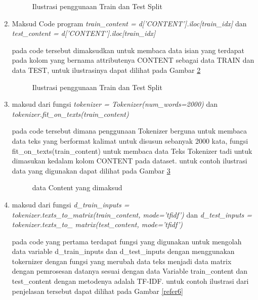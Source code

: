 \begin{enumerate}
\begin{figure}[!htbp]
      \caption{Ilustrasi  penggunaan Train dan Test Split}
      \label{refer3}
\end{figure}

\item Maksud Code program \emph{train\_content = d['CONTENT'].iloc[train\_idx]} dan \emph{test\_content = d['CONTENT'].iloc[train\_idx]}
\par pada code tersebut dimaksudkan untuk membaca data isian yang terdapat pada kolom yang bernama attributenya CONTENT sebagai data TRAIN dan data TEST, untuk ilustrasinya dapat dilihat pada Gambar \ref{refer4}

\begin{figure}[!htbp]
      \caption{Ilustrasi  penggunaan Train dan Test Split}
      \label{refer4}
\end{figure}

\item maksud dari fungsi \emph{tokenizer = Tokenizer(num\_words=2000)} dan \emph{tokenizer.fit\_on\_texts(train\_content)}
\par pada code tersebut dimana penggunaan Tokenizer berguna untuk membaca data teks yang berformat kalimat untuk disusun sebanyak 2000 kata, fungsi fit\_on\_texts(train\_content) untuk membaca data Teks Tokenizer tadi untuk dimasukan kedalam kolom CONTENT pada dataset. untuk contoh ilustrasi data yang digunakan dapat dilihat pada Gambar \ref{refer5}

\begin{figure}[!htbp]
      \caption{data Content yang dimaksud}
      \label{refer5}
\end{figure}

\item maksud dari fungsi \emph{d\_train\_inputs = tokenizer.texts\_to\_matrix(train\_content, mode='tfidf')} dan \emph{d\_test\_inputs = tokenizer.texts\_to\_ matrix(test\_content, mode='tfidf')}

\par pada code yang pertama terdapat fungsi yang digunakan untuk mengolah data variable d\_train\_inputs dan d\_test\_inputs dengan menggunakan tokernizer dengan fungsi yang merubah data teks menjadi data matrix dengan pemrosesan datanya sesuai dengan data Variable train\_content dan test\_content dengan metodenya adalah TF-IDF. untuk contoh ilustrasi dari penjelasan tersebut dapat dilihat pada Gambar \ref{refer6}


\end{enumerate}
